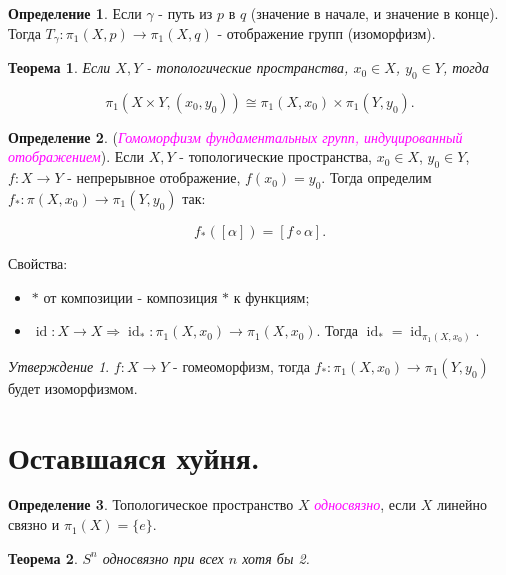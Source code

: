 \documentclass[a4paper,100pt]{article}
\theoremstyle{indented}
\newtheorem{theorem}{Теорема}
\theoremstyle{definition}
\newtheorem{defn}{Определение}
\theoremstyle{remark}
\newtheorem{stat}{Утверждение}
\DeclareMathOperator{\ra}{\rightarrow}
\DeclareMathOperator{\Ra}{\Rightarrow}
\DeclareMathOperator{\id}{id}
\begin{document}
\begin{defn}
    Если $\gamma$ - путь из $p$ в $q$ (значение в начале, и значение в конце). Тогда $T_\gamma : \pi_1(X, p) \ra \pi_1(X, q)$ - отображение групп (изоморфизм). 
\end{defn}

\begin{theorem}
    Если $X, Y$ - топологические пространства, $x_0 \in X$, $y_0 \in Y$, тогда

    \[
        \pi_1(X \times Y, (x_0, y_0)) \cong \pi_1(X, x_0) \times \pi_1(Y, y_0).
    \]
\end{theorem}

\begin{defn}
    (\textit{\textcolor{magenta}{\hypertarget{s114}{Гомоморфизм фундаментальных групп, индуцированный отображением}}}). Если $X, Y$ - топологические пространства, $x_0 \in X$, $y_0 \in Y$, $f: X \ra Y$ - непрерывное отображение, $f(x_0) = y_0$. Тогда определим $f_*: \pi(X, x_0) \ra \pi_1(Y, y_0)$ так: 

    \[
        f_*([\alpha]) = [f \circ \alpha].
    \]
\end{defn}

Свойства:

\begin{itemize}
    \item $*$ от композиции - композиция $*$ к функциям; 
    \item $\id: X \ra X \Ra \id_* : \pi_1(X, x_0) \ra \pi_1(X, x_0)$. Тогда $\id_* = \id_{\pi_1(X, x_0)}$.  
\end{itemize}

\begin{stat}
    $f: X \ra Y$ - гомеоморфизм, тогда $f_*: \pi_1(X, x_0) \ra \pi_1(Y, y_0)$ будет изоморфизмом.
\end{stat}

\section{Оставшаяся хуйня.}

\begin{defn}
    Топологическое пространство $X$ \textit{\textcolor{magenta}{\hypertarget{s115}{односвязно}}}, если $X$ линейно связно и $\pi_1(X) = \{e\}$. 
\end{defn}

\begin{theorem}
    $S^n$ односвязно при всех $n$ хотя бы 2.
\end{theorem}
\end{document}
